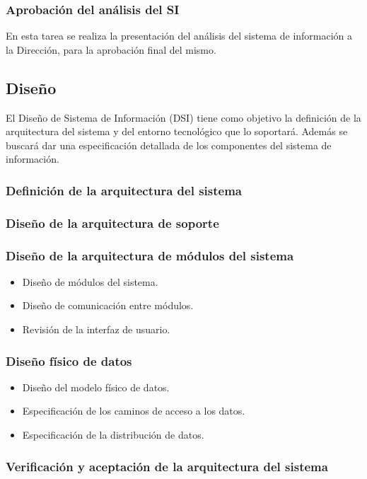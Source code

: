 \documentclass[11pt,a4paper,spanish,twoside]{book}
\begin{document}
\subsubsection{Aprobación del análisis del SI}
En esta tarea se realiza la presentación del análisis del sistema de
información a la Dirección, para la aprobación final del mismo.


\subsection{Diseño}
El Diseño de Sistema de Información (DSI) tiene como objetivo la definición
de la arquitectura del sistema y del entorno tecnológico que lo
soportará. Además se buscará dar una especificación detallada de los
componentes del sistema de información.

\subsubsection{Definición de la arquitectura del sistema}

\subsubsection{Diseño de la arquitectura de soporte}

\subsubsection{Diseño de la arquitectura de módulos del sistema}
    \begin{itemize}
    \item Diseño de módulos del sistema.
    \item Diseño de comunicación entre módulos.
    \item Revisión de la interfaz de usuario.
    \end{itemize}
\subsubsection{Diseño físico de datos}
    \begin{itemize}
    \item Diseño del modelo físico de datos.
    \item Especificación de los caminos de acceso a los datos.
    \item Especificación de la distribución de datos.
    \end{itemize}
\subsubsection{Verificación y aceptación de la arquitectura del sistema}
\end{document}
